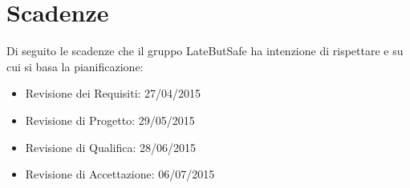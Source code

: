 \section{Scadenze}

Di seguito le scadenze che il gruppo LateButSafe ha intenzione di rispettare e su cui si basa la pianificazione:

\begin{itemize}

\item Revisione dei Requisiti: 27/04/2015
\item Revisione di Progetto: 29/05/2015
\item Revisione di Qualifica: 28/06/2015
\item Revisione di Accettazione: 06/07/2015

\end{itemize}
